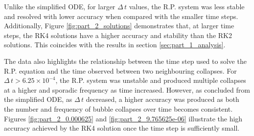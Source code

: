 \documentclass[12pt]{article}
\begin{document}
Unlike the simplified ODE, for larger $\Delta \, t$ values, the R.P. system was less stable and resolved with lower accuracy when compared with the smaller time steps. Additionally, Figure \ref{fig:part_2_solutions} demonstrates that, at larger time steps, the RK4 solutions have a higher accuracy and stability than the RK2 solutions. This coincides with the results in section \ref{sec:part_1_analysis}. 

The data also highlights the relationship between the time step used to solve the R.P. equation and the time observed between two neighbouring collapses. For $\Delta \, t > 6.25\times10^{-4}$, the R.P. system was unstable and produced multiple collapses at a higher and sporadic frequency as time increased. However, as concluded from the simplified ODE, as $\Delta \, t$ decreased, a higher accuracy was produced as both the number and frequency of bubble collapses over time becomes consistent. Figures \ref{fig:part_2_0.000625} and \ref{fig:part_2_9.765625e-06} illustrate the high accuracy achieved by the RK4 solution once the time step is sufficiently small. 
\end{document}
